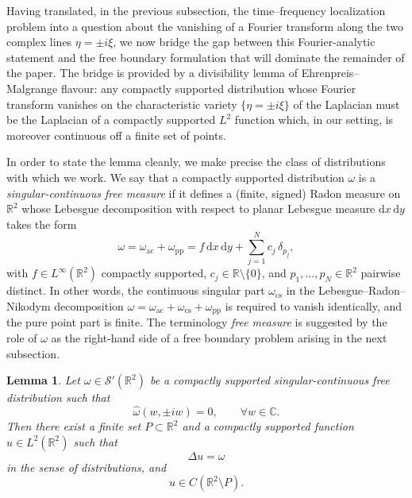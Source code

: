 \documentclass[a4paper,11pt,reqno]{amsart}
\numberwithin{equation}{section}
\theoremstyle{plain} %
\newtheorem{lemma}{Lemma}[section]
\theoremstyle{definition} %
\theoremstyle{remark}
\newcommand{\R}{\mathbb{R}}
\newcommand{\C}{\mathbb{C}}
\begin{document}
Having translated, in the previous subsection, the time--frequency
localization problem into a question about the vanishing of a Fourier
transform along the two complex lines $\eta=\pm i\xi$, we now bridge the gap
between this Fourier-analytic statement and the free boundary formulation
that will dominate the remainder of the paper. The bridge is provided by a
divisibility lemma of Ehrenpreis--Malgrange flavour: any compactly supported
distribution whose Fourier transform vanishes on the characteristic variety
$\{\eta=\pm i\xi\}$ of the Laplacian must be the Laplacian of a compactly
supported $L^2$ function which, in our setting, is moreover continuous off a
finite set of points.

In order to state the lemma cleanly, we make precise the class of
distributions with which we work. We say that a compactly supported
distribution $\omega$ is a \emph{singular-continuous free measure} if it
defines a (finite, signed) Radon measure on $\R^2$ whose Lebesgue
decomposition with respect to planar Lebesgue measure $\mathrm{d}x\,
\mathrm{d}y$ takes the form
\[
\omega = \omega_{\mathrm{ac}} + \omega_{\mathrm{pp}}
       = f\,\mathrm{d}x\,\mathrm{d}y + \sum_{j=1}^N c_j\,\delta_{p_j},
\]
with \(f\in L^\infty(\R^2)\) compactly supported, \(c_j\in \R\setminus\{0\}\), and
$p_1,\ldots,p_N\in \R^2$ pairwise distinct. In other words, the continuous
singular part $\omega_{\mathrm{cs}}$ in the Lebesgue--Radon--Nikodym
decomposition $\omega=\omega_{\mathrm{ac}}+\omega_{\mathrm{cs}}+
\omega_{\mathrm{pp}}$ is required to vanish identically, and the pure
point part is finite. The terminology \emph{free measure} is suggested by
the role of $\omega$ as the right-hand side of a free boundary problem
arising in the next subsection.

\begin{lemma}\label{lemma:fourier-to-fboundary}
Let $\omega\in \mathcal{S}'(\R^2)$ be a compactly supported singular-continuous
free distribution such that
\[
\widehat{\omega}(w,\pm iw)=0,\qquad \forall w\in\C.
\]
Then there exist a finite set $P\subset \R^2$ and a compactly supported
function $u\in L^2(\R^2)$ such that
\[
\Delta u=\omega
\]
in the sense of distributions, and
\[
u\in C(\R^2\setminus P).
\]
\end{lemma}
\end{document}
